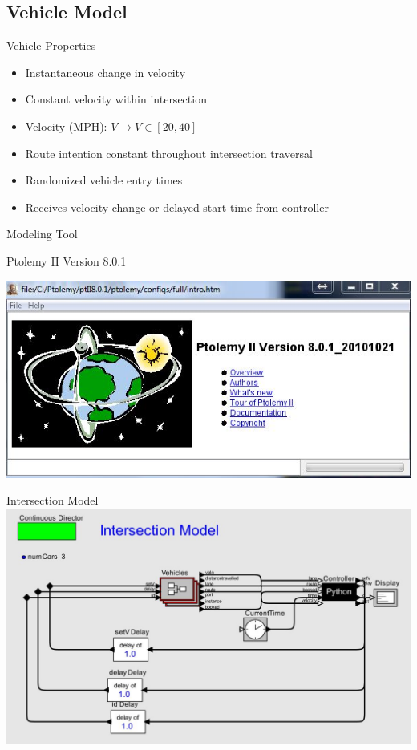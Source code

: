 \subsection{Vehicle Model}

\begin{frame}{Vehicle Properties}
\begin{itemize}
\item Instantaneous change in velocity
\item Constant velocity within intersection
\item Velocity (MPH): $V \rightarrow V \in [20,40]$
\item Route intention constant throughout intersection traversal
\item Randomized vehicle entry times
\item Receives velocity change or delayed start time from controller
\end{itemize}
\end{frame}

\begin{frame}{Modeling Tool}
\begin{center}
Ptolemy II Version 8.0.1

\includegraphics[scale=0.5]{diagram/ptolemy.jpg}
\end{center}
\end{frame}

\begin{frame}{Intersection Model}
\centering\includegraphics[width=0.9\linewidth]{diagram/ptolemy_system.jpg}
\end{frame}

